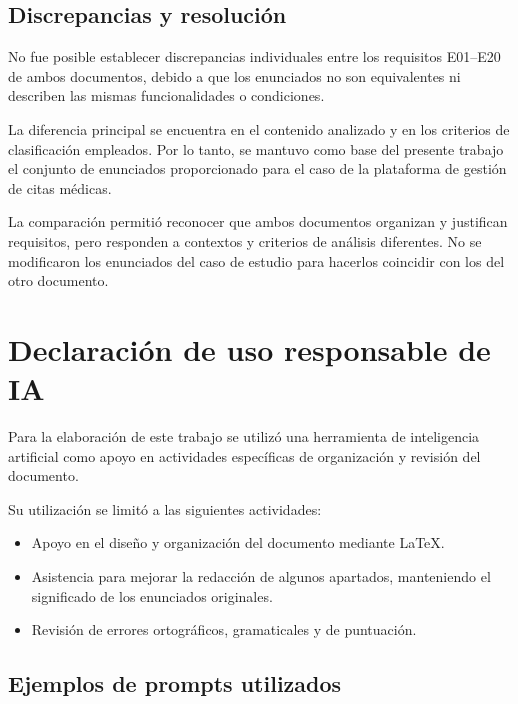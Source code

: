 \documentclass[12pt,a4paper]{article}
\begin{document}
\subsection{Discrepancias y resolución}

No fue posible establecer discrepancias individuales
entre los requisitos E01--E20 de ambos documentos, debido
a que los enunciados no son equivalentes ni describen
las mismas funcionalidades o condiciones.

La diferencia principal se encuentra en el contenido
analizado y en los criterios de clasificación empleados.
Por lo tanto, se mantuvo como base del presente trabajo
el conjunto de enunciados proporcionado para el caso
de la plataforma de gestión de citas médicas.

La comparación permitió reconocer que ambos documentos
organizan y justifican requisitos, pero responden a
contextos y criterios de análisis diferentes. No se
modificaron los enunciados del caso de estudio para
hacerlos coincidir con los del otro documento.

\section{Declaración de uso responsable de IA}

Para la elaboración de este trabajo se utilizó una
herramienta de inteligencia artificial como apoyo en
actividades específicas de organización y revisión
del documento.

Su utilización se limitó a las siguientes actividades:

\begin{itemize}
    \item Apoyo en el diseño y organización del documento
    mediante LaTeX.
    \item Asistencia para mejorar la redacción de algunos
    apartados, manteniendo el significado de los
    enunciados originales.
    \item Revisión de errores ortográficos, gramaticales
    y de puntuación.
\end{itemize}

\subsection*{Ejemplos de prompts utilizados}
\end{document}
